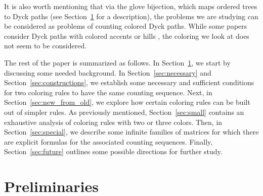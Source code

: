 \documentclass[12pt]{amsart}
\begin{document}
It is also worth mentioning that via the glove bijection, which maps ordered trees to Dyck paths (see Section~\ref{sec:prelim} for a description), the problems we are studying can be considered as problems of counting colored Dyck paths. 
While some papers consider Dyck paths with colored accents or hills \cite{asinowski2008dyck,manesbijections}, the coloring we look at does not seem to be considered.     

The rest of the paper is summarized as follows. In Section~\ref{sec:prelim}, we start by discussing some needed background. In Section~\ref{sec:necessary} and Section~\ref{sec:constructions}, we establish some necessary and sufficient conditions for two coloring rules to have the same counting sequence. 
Next, in Section~\ref{sec:new_from_old}, we explore how certain coloring rules can be built out of simpler rules. 
As previously mentioned, Section~\ref{sec:small} contains an exhaustive analysis of coloring rules with two or three colors.
Then, in Section~\ref{sec:special}, we describe some infinite families of matrices for which there are explicit formulas for the associated counting sequences. 
Finally, Section~\ref{sec:future} outlines some possible directions for further study.





\section{Preliminaries}\label{sec:prelim}
\end{document}
